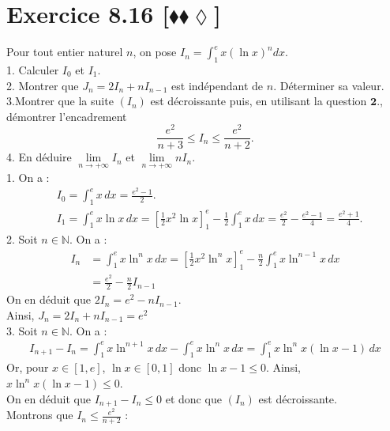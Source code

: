 \documentclass[10pt]{article}
\begin{document}
\section*{Exercice 8.16 [$\blacklozenge\blacklozenge\lozenge$]}
\begin{tcolorbox}[enhanced, width=7in, center, size=fbox, fontupper=\large, drop shadow southwest]
    Pour tout entier naturel $n$, on pose $I_n=\int_1^e{x(\ln x)^ndx}$.\\
    1. Calculer $I_0$ et $I_1$.\\
    2. Montrer que $J_n=2I_n+nI_{n-1}$ est indépendant de $n$. Déterminer sa valeur.\\
    3.\hspace{0.2cm}Montrer que la suite $(I_n)$ est décroissante puis, en utilisant la question $\mathbf{2.}$, démontrer l'encadrement
    \begin{equation*}
        \frac{e^2}{n+3} \leq I_n \leq \frac{e^2}{n+2}.
    \end{equation*}  
    4. En déduire $\lim\limits_{n\to+\infty}{I_n}$ et $\lim\limits_{n\to+\infty}{nI_n}$.\\[0.25cm]
    1. On a : 
    \begin{align*}
        &I_0=\int_1^e{x\,dx}=\frac{e^2-1}{2}.\\
        &I_1=\int_1^e{x\ln x\,dx}=\left[\frac{1}{2}x^2\ln x\right]_1^e-\frac{1}{2}\int_1^e{x\,dx}=\frac{e^2}{2}-\frac{e^2-1}{4}=\frac{e^2+1}{4}.
    \end{align*}
    2. Soit $n\in\mathbb{N}$. On a :
    \begin{align*}
        I_n &= \int_1^e{x\ln^nx\,dx} = \left[\frac{1}{2}x^2\ln^nx\right]_1^e-\frac{n}{2}\int_1^e{x\ln^{n-1}x\,dx}\\
        &=\frac{e^2}{2}-\frac{n}{2}I_{n-1}
    \end{align*}
    On en déduit que $2I_n=e^2-nI_{n-1}$.\\
    Ainsi, $J_n = 2I_n + nI_{n-1} = e^2$\\
    3. Soit $n\in\mathbb{N}$. On a : 
    \begin{align*}
        I_{n+1} - I_{n} = \int_1^e{x\ln^{n+1}x\,dx} - \int_1^e{x\ln^{n}x\,dx} = \int_1^e{x\ln^nx(\ln x-1)\,dx}
    \end{align*}
    Or, pour $x\in\left[1,e\right]$, $\ln x \in [0,1]$ donc $\ln x - 1 \leq 0$. Ainsi, $x\ln^nx(\ln x-1) \leq 0$.\\
    On en déduit que $I_{n+1}-I_n\leq0$ et donc que $(I_n)$ est décroissante.\\
    Montrons que $I_n \leq \frac{e^2}{n+2}$ :

\end{tcolorbox}
\end{document}
